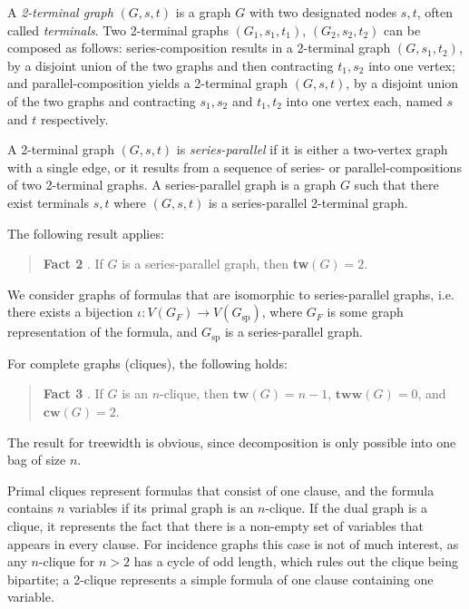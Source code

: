 \documentclass{article}
\begin{document}
A {\em 2-terminal graph} $(G, s, t)$ is a graph $G$ with two designated nodes $s, t$, often called {\em terminals}.
Two 2-terminal graphs $(G_1, s_1, t_1)$, $(G_2, s_2, t_2)$ can be composed as follows:
series-composition results in a 2-terminal graph $(G, s_1, t_2)$, by a disjoint union of the two graphs and then contracting $t_1, s_2$ into one vertex;
and parallel-composition yields a 2-terminal graph $(G, s, t)$, by a disjoint union of the two graphs and contracting $s_1, s_2$ and $t_1, t_2$ into one vertex each, named $s$ and $t$ respectively.

A 2-terminal graph $(G, s, t)$ is {\em series-parallel} if it is either a two-vertex graph with a single edge,
or it results from a sequence of series- or parallel-compositions of two 2-terminal graphs.
A series-parallel graph is a graph $G$ such that there exist terminals $s, t$ where $(G, s, t)$ is a series-parallel 2-terminal graph.

The following result applies:

\begin{quote}
	\textbf{Fact 2}
	\cite{DBLP:journals/corr/abs-2004-00547}. If $G$ is a series-parallel graph, then \textbf{tw}$(G) = 2$. 
\end{quote}

\noindent
We consider graphs of formulas that are isomorphic to series-parallel graphs, i.e. there exists a bijection $\iota : V(G_F) \rightarrow V(G_{\text{sp}})$, where $G_F$ is some graph representation of the formula, and $G_{\text{sp}}$ is a series-parallel graph.

For complete graphs (cliques), the following holds:
\begin{quote}
	\textbf{Fact 3} \cite{DBLP:conf/focs/Bonnet0TW20, DBLP:journals/dam/FischerMR08}.
	If $G$ is an $n$-clique, then $\mathbf{tw}(G) = n - 1$, $\mathbf{tww}(G) = 0$, and $\mathbf{cw}(G) = 2$.
\end{quote}

\noindent
The result for treewidth is obvious, since decomposition is only possible into one bag of size $n$.

Primal cliques represent formulas that consist of one clause, and the formula contains $n$ variables if its primal graph is an $n$-clique.
If the dual graph is a clique, it represents the fact that there is a non-empty set of variables that appears in every clause.
For incidence graphs this case is not of much interest, as any $n$-clique for $n > 2$ has a cycle of odd length, which rules out the clique being bipartite; a 2-clique represents a simple formula of one clause containing one variable.
\end{document}
